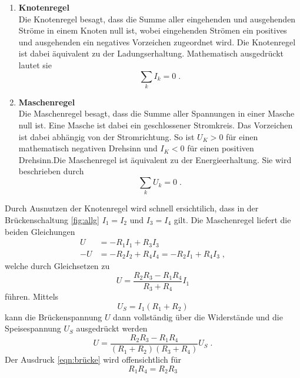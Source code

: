 \begin{enumerate}
    \item\textbf{Knotenregel}
    \\\noindent
    Die Knotenregel besagt, dass die Summe aller eingehenden und ausgehenden Ströme in einem Knoten null ist, wobei eingehenden Strömen
    ein positives und ausgehenden ein negatives Vorzeichen zugeordnet wird. Die Knotenregel ist dabei äquivalent zu der Ladungserhaltung.
    Mathematisch ausgedrückt lautet sie
    \begin{equation}
        \sum_k I_k=0 \;.
        \label{eqn:kirchhoff1}
    \end{equation}

    \item\textbf{Maschenregel}
    \\\noindent
    Die Maschenregel besagt, dass die Summe aller Spannungen in einer Masche null ist. Eine Masche ist dabei ein geschlossener Stromkreis.
    Das Vorzeichen ist dabei abhängig von der Stromrichtung. So ist $U_K>0$ für einen mathematisch negativen Drehsinn und $I_K<0$ für einen
    positiven Drehsinn.Die Maschenregel ist äquivalent zu der Energieerhaltung. Sie wird beschrieben durch
    \begin{equation}
        \sum_k U_k=0 \;.
        \label{eqn:kirchhoff2}
    \end{equation}
\end{enumerate}
Durch Ausnutzen der Knotenregel wird schnell ersichtilich, dass in der Brückenschaltung \ref{fig:allg} $I_1=I_2$ und $I_3=I_4$ gilt.
Die Maschenregel liefert die beiden Gleichungen
\begin{align*}
    U &=-R_1I_1 + R_3I_3\\
    -U&=-R_2I_2 + R_4I_4 = -R_2I_1+R_4I_3 \;,
\end{align*}
welche durch Gleichsetzen zu
\begin{equation*}
    U=\frac{R_2R_3-R_1R_4}{R_3+R_4}I_1
\end{equation*}
führen. Mittels
\begin{equation*}
    U_S=I_1(R_1+R_2)
\end{equation*}
kann die Brückenspannung $U$ dann vollständig über die Widerstände und die Speisespannung $U_S$ ausgedrückt werden
\begin{equation}
    U=\frac{R_2R_3-R_1R_4}{(R_1+R_2)(R_3+R_4)}U_S\;.
    \label{eqn:brücke}
\end{equation}
Der Ausdruck \eqref{eqn:brücke} wird offensichtlich für
\begin{equation}
    R_1R_4=R_2R_3
    \label{eqn:abgleich}
\end{equation}
